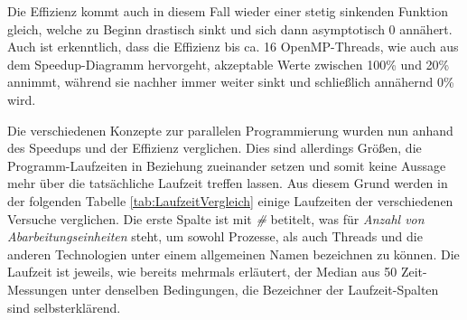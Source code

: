 \begin{description}
						Die Effizienz kommt auch in diesem Fall wieder einer stetig sinkenden Funktion gleich, welche zu Beginn drastisch sinkt und sich dann asymptotisch 0 annähert. Auch ist erkenntlich, dass die Effizienz bis ca. 16 OpenMP-Threads, wie auch aus dem Speedup-Diagramm hervorgeht, akzeptable Werte zwischen 100\% und 20\% annimmt, während sie nachher immer weiter sinkt und schließlich annähernd 0\% wird.

				\end{description}
			
				Die verschiedenen Konzepte zur parallelen Programmierung wurden nun anhand des Speedups und der Effizienz verglichen. Dies sind allerdings Größen, die Programm-Laufzeiten in Beziehung zueinander setzen und somit keine Aussage mehr über die tatsächliche Laufzeit treffen lassen. Aus diesem Grund werden in der folgenden Tabelle \ref{tab:LaufzeitVergleich} einige Laufzeiten der verschiedenen Versuche verglichen. Die erste Spalte ist mit \textit{\#} betitelt, was für \textit{Anzahl von Abarbeitungseinheiten} steht, um sowohl Prozesse, als auch Threads und die anderen Technologien unter einem allgemeinen Namen bezeichnen zu können. Die Laufzeit ist jeweils, wie bereits mehrmals erläutert, der Median aus 50 Zeit-Messungen unter denselben Bedingungen, die Bezeichner der Laufzeit-Spalten sind selbsterklärend.
				
